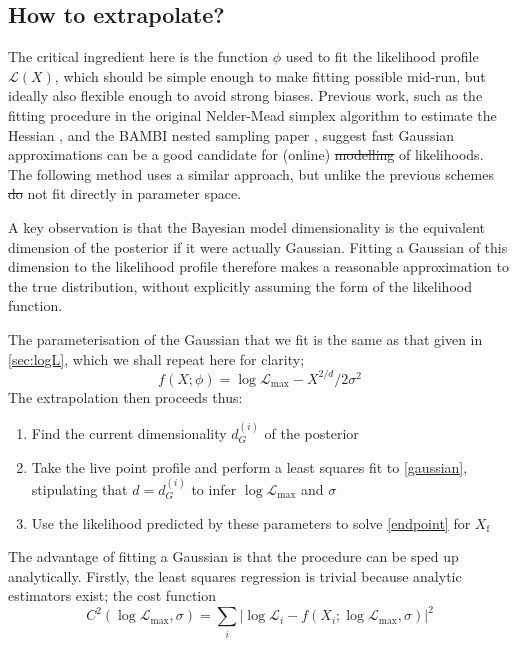 \documentclass[usenatbib]{mnras}
\newcommand{\Like}{\mathcal{L}}
\newcommand{\logLmax}{\log \Like_\mathrm{max}}
\providecommand{\DIFaddtex}[1]{{\protect\color{blue}\uwave{#1}}} %
\providecommand{\DIFdeltex}[1]{{\protect\color{red}\sout{#1}}}                      %
\providecommand{\DIFaddbegin}{} %
\providecommand{\DIFaddend}{} %
\providecommand{\DIFdelbegin}{} %
\providecommand{\DIFdelend}{} %
\providecommand{\DIFadd}[1]{\texorpdfstring{\DIFaddtex{#1}}{#1}} %
\providecommand{\DIFdel}[1]{\texorpdfstring{\DIFdeltex{#1}}{}} %
\newcommand{\DIFscaledelfig}{0.5}
\newlength{\DIFdelgraphicswidth} %
\newlength{\DIFdelgraphicsheight} %
\newcommand{\DIFaddincludegraphics}[2][]{{\color{blue}\fbox{\DIFOincludegraphics[#1]{#2}}}} %
\newcommand{\DIFdelincludegraphics}[2][]{%
\sbox{\DIFdelgraphicsbox}{\DIFOincludegraphics[#1]{#2}}%
\settoboxwidth{\DIFdelgraphicswidth}{\DIFdelgraphicsbox} %
\settoboxtotalheight{\DIFdelgraphicsheight}{\DIFdelgraphicsbox} %
\scalebox{\DIFscaledelfig}{%
\parbox[b]{\DIFdelgraphicswidth}{\usebox{\DIFdelgraphicsbox}\\[-\baselineskip] \rule{\DIFdelgraphicswidth}{0em}}\llap{\resizebox{\DIFdelgraphicswidth}{\DIFdelgraphicsheight}{%
\setlength{\unitlength}{\DIFdelgraphicswidth}%
\begin{picture}(1,1)%
\thicklines\linethickness{2pt} %
{\color[rgb]{1,0,0}\put(0,0){\framebox(1,1){}}}%
{\color[rgb]{1,0,0}\put(0,0){\line( 1,1){1}}}%
{\color[rgb]{1,0,0}\put(0,1){\line(1,-1){1}}}%
\end{picture}%
}\hspace*{3pt}}} %
} %
\DeclareRobustCommand{\DIFaddbegin}{\DIFOaddbegin \let\includegraphics\DIFaddincludegraphics} %
\DeclareRobustCommand{\DIFaddend}{\DIFOaddend \let\includegraphics\DIFOincludegraphics} %
\DeclareRobustCommand{\DIFdelbegin}{\DIFOdelbegin \let\includegraphics\DIFdelincludegraphics} %
\DeclareRobustCommand{\DIFdelend}{\DIFOaddend \let\includegraphics\DIFOincludegraphics} %
\begin{document}
\subsection{How to extrapolate?}\label{sec:how_to_extrapolate}
The critical ingredient here is the function $\phi$ used to fit the likelihood profile $\Like(X)$, which should be simple enough to make fitting possible mid-run, but ideally also flexible enough to avoid strong biases. 
Previous work, such as the fitting procedure in the original Nelder-Mead simplex algorithm to estimate the Hessian \citep{nelder_mead}, and the BAMBI nested sampling paper \citep{Graff_2012}, suggest fast Gaussian approximations can be a good candidate for (online) \DIFdelbegin \DIFdel{modelling }\DIFdelend \DIFaddbegin \DIFadd{modeling }\DIFaddend of likelihoods. The following method uses a similar approach, but unlike the previous schemes \DIFdelbegin \DIFdel{do }\DIFdelend \DIFaddbegin \DIFadd{does }\DIFaddend not fit directly in parameter space.
\par
A key observation is that the Bayesian model dimensionality is the equivalent dimension of the posterior if it were actually Gaussian. Fitting a Gaussian of this dimension to the likelihood profile therefore makes a reasonable approximation to the true distribution, without explicitly assuming the form of the likelihood function. 
\par
The parameterisation of the Gaussian that we fit is the same as that given in \cref{sec:logL}, which we shall repeat here for clarity;
\begin{equation}\label{gaussian}
    f(X; \phi) = \logLmax - X^{2/d}/2\sigma^2
\end{equation}
The extrapolation then proceeds thus:
\begin{enumerate}[leftmargin=*]
    \item Find the current dimensionality ${d}^{(i)}_G$ of the posterior
    \item Take the live point profile and perform a least squares fit to \cref{gaussian}, stipulating that $d = {d}^{(i)}_G$ to infer $\logLmax$ and $\sigma$ 
    \item Use the likelihood predicted by these parameters to solve \cref{endpoint} for $X_\mathrm{f}$
\end{enumerate}
The advantage of fitting a Gaussian is that the procedure can be sped up analytically. Firstly, the least squares regression is trivial because analytic estimators exist; the cost function 
\begin{equation}\label{chi squared}
	C^2(\logLmax, \sigma) = \sum_i \left| \log \Like_i - f(X_i; \logLmax, \sigma) \right| ^2
\end{equation}
\end{document}
